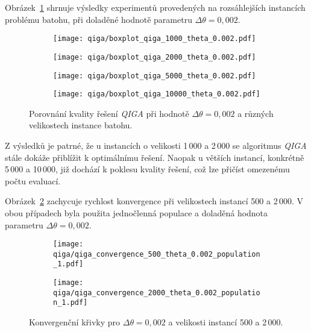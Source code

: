 Obrázek~\ref{fig:qiga-large} shrnuje výsledky experimentů provedených na rozsáhlejších instancích problému batohu, při doladěné hodnotě parametru $\Delta\theta = 0,002$. 
\begin{figure}[ht!]
    \centering
    \begin{subfigure}[b]{0.24\textwidth}
      \texttt{[image: qiga/boxplot\_qiga\_1000\_theta\_0.002.pdf]}
    \end{subfigure}
    \hfill
    \begin{subfigure}[b]{0.24\textwidth}
        \texttt{[image: qiga/boxplot\_qiga\_2000\_theta\_0.002.pdf]}
    \end{subfigure}
    \hfill
    \begin{subfigure}[b]{0.24\textwidth}
        \texttt{[image: qiga/boxplot\_qiga\_5000\_theta\_0.002.pdf]}
    \end{subfigure}
    \hfill
    \begin{subfigure}[b]{0.24\textwidth}
        \texttt{[image: qiga/boxplot\_qiga\_10000\_theta\_0.002.pdf]}
    \end{subfigure}
  
    \caption{Porovnání kvality řešení \emph{QIGA} při hodnotě $\Delta\theta = 0,002$ a různých velikostech instance batohu.}
    \label{fig:qiga-large}
\end{figure}

Z výsledků je patrné, že u instancích o velikosti 1\,000 a 2\,000 se algoritmus \emph{QIGA} stále dokáže přiblížit k optimálnímu řešení. 
Naopak u větších instancí, konkrétně 5\,000 a 10\,000, již dochází k poklesu kvality řešení, což lze přičíst omezenému počtu evaluací. 

Obrázek~\ref{fig:qiga-convergence} zachycuje rychlost konvergence při velikostech instancí 500 a 2\,000. 
V obou případech byla použita jednočlenná populace a doladěná hodnota parametru $\Delta\theta = 0,002$.
\begin{figure}[ht!]
    \centering
    \begin{subfigure}[b]{0.48\textwidth}
      \texttt{[image: qiga/qiga\_convergence\_500\_theta\_0.002\_population\_1.pdf]}
    \end{subfigure}
    \hfill
    \begin{subfigure}[b]{0.48\textwidth}
        \texttt{[image: qiga/qiga\_convergence\_2000\_theta\_0.002\_population\_1.pdf]}
    \end{subfigure}
    \caption{Konvergenční křivky pro $\Delta\theta = 0,002$ a velikosti instancí 500 a 2\,000.}
    \label{fig:qiga-convergence}
\end{figure}

